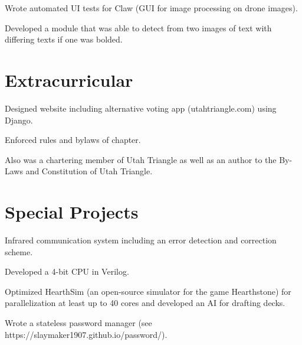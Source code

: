\documentclass[letterpaper]{deedy-resume} %
\begin{document}
\begin{minipage}[t]{0.64\textwidth}
\sectionspace



\begin{tightitemize}
\item Wrote automated UI tests for Claw (GUI for image processing on drone images).
\item Developed a module that was able to detect from two images of text with differing texts if one was bolded.
\end{tightitemize}

\sectionspace %


\section{Extracurricular}

\begin{tightitemize}
\item Designed website including alternative voting app (utahtriangle.com) using Django.
\item Enforced rules and bylaws of chapter.
\item Also was a chartering member of Utah Triangle as well as an author to the By-Laws and Constitution of Utah Triangle.
\end{tightitemize}

\sectionspace %


\section{Special Projects}
\vspace{\topsep} %
\begin{tightitemize}
\item Infrared communication system including an error detection and correction scheme.
\item Developed a 4-bit CPU in Verilog.
\item Optimized HearthSim (an open-source simulator for the game Hearthstone) for parallelization at least up to 40 cores and developed an AI for drafting decks.
\item Wrote a stateless password manager (see https://slaymaker1907.github.io/password/).
\end{tightitemize}
\sectionspace %




\end{minipage}
\end{document}
